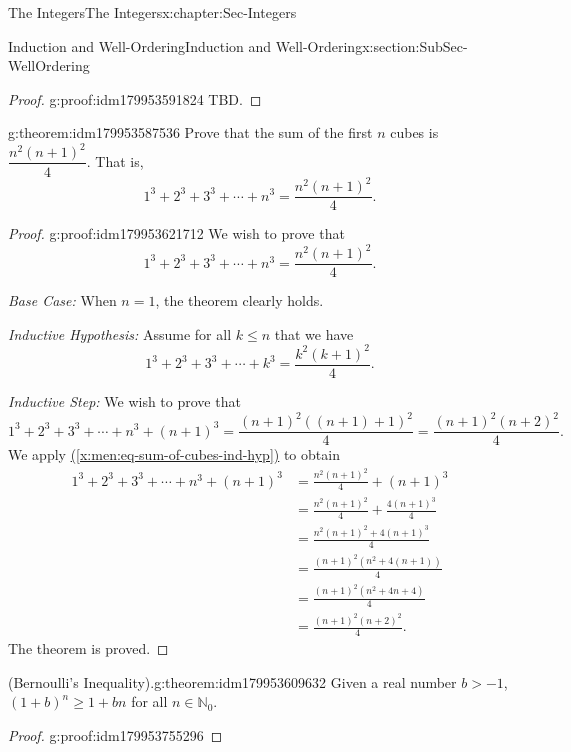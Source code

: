 \documentclass[oneside,10pt,]{book}
\newcommand{\xreffont}{\relax}
\numberwithin{equation}{section}
\renewcommand{\le}{\leqslant}
\renewcommand{\ge}{\geqslant}
\def\N{{\mathbb N}}
\newcommand{\amp}{&}
\begin{document}
\begin{chapterptx}{The Integers}{}{The Integers}{}{}{x:chapter:Sec-Integers}
\begin{sectionptx}{Induction and Well-Ordering}{}{Induction and Well-Ordering}{}{}{x:section:SubSec-WellOrdering}
\begin{proof}{}{g:proof:idm179953591824}
TBD.%
\end{proof}
\begin{theorem}{}{}{g:theorem:idm179953587536}%
Prove that the sum of the first \(n\) cubes is \(\dfrac{n^2(n+1)^2}{4}\). That is,%
%
\begin{equation*}
1^3 + 2^3 + 3^3 + \cdots + n^3 = \dfrac{n^2(n+1)^2}{4}.
\end{equation*}
\end{theorem}
\begin{proof}{}{g:proof:idm179953621712}
We wish to prove that%
\begin{equation*}
1^3 + 2^3 + 3^3 + \cdots + n^3 = \frac{n^2(n+1)^2}{4}.
\end{equation*}
%
\par
\emph{Base Case:} When \(n=1\), the theorem clearly holds.%
\par
\emph{Inductive Hypothesis:} Assume for all \(k\le n\) that we have%
\begin{equation}
1^3 + 2^3 + 3^3 + \cdots + k^3 = \frac{k^2(k+1)^2}{4}.\label{x:men:eq-sum-of-cubes-ind-hyp}
\end{equation}
%
\par
\emph{Inductive Step:} We wish to prove that%
\begin{equation*}
1^3 + 2^3 + 3^3 + \cdots + n^3 +(n+1)^3 = \frac{(n+1)^2((n+1)+1)^2}{4} = \frac{(n+1)^2(n+2)^2}{4}.
\end{equation*}
We apply \hyperref[x:men:eq-sum-of-cubes-ind-hyp]{({\xreffont\ref{x:men:eq-sum-of-cubes-ind-hyp}})} to obtain%
\begin{align*}
1^3 + 2^3 + 3^3 + \cdots + n^3 +(n+1)^3 \amp = \frac{n^2(n+1)^2}{4} + (n+1)^3 \\
\amp = \frac{n^2(n+1)^2}{4} + \frac{4(n+1)^3}{4}\\
\amp = \frac{n^2(n+1)^2 + 4(n+1)^3}{4}\\
\amp = \frac{(n+1)^2 (n^2+4(n+1))}{4}\\
\amp = \frac{(n+1)^2 (n^2+4n+4)}{4}\\
\amp = \frac{(n+1)^2 (n+2)^2}{4}.
\end{align*}
The theorem is proved.%
\end{proof}
\begin{theorem}{(Bernoulli's Inequality).}{}{g:theorem:idm179953609632}%
Given a real number \(b > -1\), \((1+b)^n \ge 1 + bn\) for all \(n\in \N_0\).\end{theorem}
\begin{proof}{}{g:proof:idm179953755296}

\end{proof}
\end{sectionptx}
\end{chapterptx}
\end{document}
